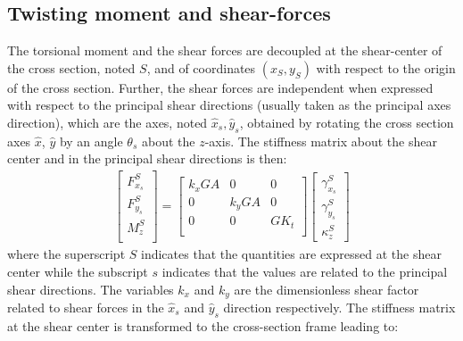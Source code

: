 \documentclass[11pt]{article}
\newcommand{\sh}{{S}}
\newcommand{\GK}{G\!K_t}
\newcommand{\GA}{G\!A}
\begin{document}
\subsection{Twisting moment and shear-forces}
The torsional moment and the shear forces are decoupled at the shear-center of the cross section, noted $\sh$, and of coordinates $(x_\sh, y_\sh)$ with respect to the origin of the cross section.
Further, the shear forces are independent when expressed with respect to the principal shear directions (usually taken as the principal axes direction), which are the axes, noted $\hat{x}_s, \hat{y}_s$, obtained by rotating the cross section axes $\hat{x}$, $\hat{y}$ by an angle $\theta_s$ about the $z$-axis.
The stiffness matrix about the shear center and in the principal shear directions is then:
\begin{align}
    \begin{bmatrix} F_{x_s}^\sh \\ F_{y_s}^\sh\\M_z^\sh \\ \end{bmatrix}
    =
    \begin{bmatrix}
     k_x \GA & 0 & 0\\
     0 & k_y \GA &0  \\
     0 & 0  & \GK\\
    \end{bmatrix}
    \begin{bmatrix}\gamma_{x_s}^\sh \\ \gamma_{y_s}^\sh \\ \kappa_{z}^\sh \end{bmatrix}
    \label{eq:ShearTorsionAtShearCenterInShearDirections}
\end{align}
where the superscript $\sh$ indicates that the quantities are expressed at the shear center while the subscript $s$ indicates that the values are related to the principal shear directions. The variables $k_x$ and $k_y$ are the dimensionless shear factor related to shear forces in the $\hat{x}_s$ and $\hat{y}_s$ direction respectively.
    The stiffness matrix at the shear center is transformed to the cross-section frame leading to:
\end{document}

